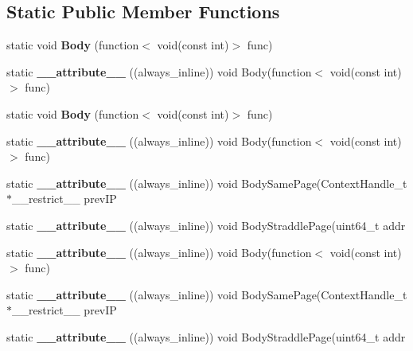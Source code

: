 \subsection*{Static Public Member Functions}
\begin{DoxyCompactItemize}
\item 
\hypertarget{structUnrolledLoop_aedc6cef509c3586242912608353d5859}{static void {\bfseries Body} (function$<$ void(const int)$>$ func)}\label{structUnrolledLoop_aedc6cef509c3586242912608353d5859}

\item 
\hypertarget{structUnrolledLoop_a16a795e570b76d8ce7f636c86cacfc55}{static {\bfseries \-\_\-\-\_\-attribute\-\_\-\-\_\-} ((always\-\_\-inline)) void Body(function$<$ void(const int)$>$ func)}\label{structUnrolledLoop_a16a795e570b76d8ce7f636c86cacfc55}

\item 
\hypertarget{structUnrolledLoop_aedc6cef509c3586242912608353d5859}{static void {\bfseries Body} (function$<$ void(const int)$>$ func)}\label{structUnrolledLoop_aedc6cef509c3586242912608353d5859}

\item 
\hypertarget{structUnrolledLoop_a16a795e570b76d8ce7f636c86cacfc55}{static {\bfseries \-\_\-\-\_\-attribute\-\_\-\-\_\-} ((always\-\_\-inline)) void Body(function$<$ void(const int)$>$ func)}\label{structUnrolledLoop_a16a795e570b76d8ce7f636c86cacfc55}

\item 
\hypertarget{structUnrolledLoop_a9189cf60441b47e2ac4aee093f944151}{static {\bfseries \-\_\-\-\_\-attribute\-\_\-\-\_\-} ((always\-\_\-inline)) void Body\-Same\-Page(Context\-Handle\-\_\-t $\ast$\-\_\-\-\_\-restrict\-\_\-\-\_\- prev\-I\-P}\label{structUnrolledLoop_a9189cf60441b47e2ac4aee093f944151}

\item 
\hypertarget{structUnrolledLoop_a47b229d1553314c5e4e41e0d81bbec7f}{static {\bfseries \-\_\-\-\_\-attribute\-\_\-\-\_\-} ((always\-\_\-inline)) void Body\-Straddle\-Page(uint64\-\_\-t addr}\label{structUnrolledLoop_a47b229d1553314c5e4e41e0d81bbec7f}

\item 
\hypertarget{structUnrolledLoop_a16a795e570b76d8ce7f636c86cacfc55}{static {\bfseries \-\_\-\-\_\-attribute\-\_\-\-\_\-} ((always\-\_\-inline)) void Body(function$<$ void(const int)$>$ func)}\label{structUnrolledLoop_a16a795e570b76d8ce7f636c86cacfc55}

\item 
\hypertarget{structUnrolledLoop_a9189cf60441b47e2ac4aee093f944151}{static {\bfseries \-\_\-\-\_\-attribute\-\_\-\-\_\-} ((always\-\_\-inline)) void Body\-Same\-Page(Context\-Handle\-\_\-t $\ast$\-\_\-\-\_\-restrict\-\_\-\-\_\- prev\-I\-P}\label{structUnrolledLoop_a9189cf60441b47e2ac4aee093f944151}

\item 
\hypertarget{structUnrolledLoop_a47b229d1553314c5e4e41e0d81bbec7f}{static {\bfseries \-\_\-\-\_\-attribute\-\_\-\-\_\-} ((always\-\_\-inline)) void Body\-Straddle\-Page(uint64\-\_\-t addr}\label{structUnrolledLoop_a47b229d1553314c5e4e41e0d81bbec7f}

\end{DoxyCompactItemize}
